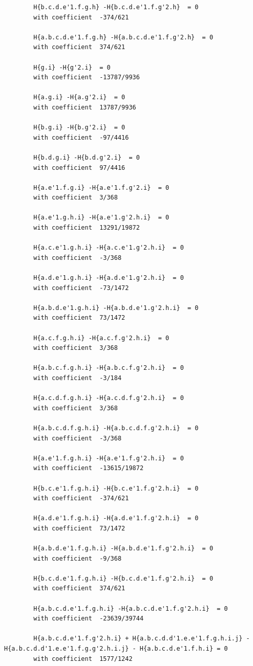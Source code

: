 \documentclass[11pt, a4paper]{kybernetika}
\begin{document}
\begin{verbatim}
		H{b.c.d.e'1.f.g.h} -H{b.c.d.e'1.f.g'2.h}  = 0
		with coefficient  -374/621
		
		H{a.b.c.d.e'1.f.g.h} -H{a.b.c.d.e'1.f.g'2.h}  = 0
		with coefficient  374/621
		
		H{g.i} -H{g'2.i}  = 0
		with coefficient  -13787/9936
		
		H{a.g.i} -H{a.g'2.i}  = 0
		with coefficient  13787/9936
		
		H{b.g.i} -H{b.g'2.i}  = 0
		with coefficient  -97/4416
		
		H{b.d.g.i} -H{b.d.g'2.i}  = 0
		with coefficient  97/4416
		
		H{a.e'1.f.g.i} -H{a.e'1.f.g'2.i}  = 0
		with coefficient  3/368
		
		H{a.e'1.g.h.i} -H{a.e'1.g'2.h.i}  = 0
		with coefficient  13291/19872
		
		H{a.c.e'1.g.h.i} -H{a.c.e'1.g'2.h.i}  = 0
		with coefficient  -3/368
		
		H{a.d.e'1.g.h.i} -H{a.d.e'1.g'2.h.i}  = 0
		with coefficient  -73/1472
		
		H{a.b.d.e'1.g.h.i} -H{a.b.d.e'1.g'2.h.i}  = 0
		with coefficient  73/1472
		
		H{a.c.f.g.h.i} -H{a.c.f.g'2.h.i}  = 0
		with coefficient  3/368
		
		H{a.b.c.f.g.h.i} -H{a.b.c.f.g'2.h.i}  = 0
		with coefficient  -3/184
		
		H{a.c.d.f.g.h.i} -H{a.c.d.f.g'2.h.i}  = 0
		with coefficient  3/368
		
		H{a.b.c.d.f.g.h.i} -H{a.b.c.d.f.g'2.h.i}  = 0
		with coefficient  -3/368
		
		H{a.e'1.f.g.h.i} -H{a.e'1.f.g'2.h.i}  = 0
		with coefficient  -13615/19872
		
		H{b.c.e'1.f.g.h.i} -H{b.c.e'1.f.g'2.h.i}  = 0
		with coefficient  -374/621
		
		H{a.d.e'1.f.g.h.i} -H{a.d.e'1.f.g'2.h.i}  = 0
		with coefficient  73/1472
		
		H{a.b.d.e'1.f.g.h.i} -H{a.b.d.e'1.f.g'2.h.i}  = 0
		with coefficient  -9/368
		
		H{b.c.d.e'1.f.g.h.i} -H{b.c.d.e'1.f.g'2.h.i}  = 0
		with coefficient  374/621
		
		H{a.b.c.d.e'1.f.g.h.i} -H{a.b.c.d.e'1.f.g'2.h.i}  = 0
		with coefficient  -23639/39744
		
		H{a.b.c.d.e'1.f.g'2.h.i} + H{a.b.c.d.d'1.e.e'1.f.g.h.i.j} - H{a.b.c.d.d'1.e.e'1.f.g.g'2.h.i.j} - H{a.b.c.d.e'1.f.h.i} = 0
		with coefficient  1577/1242
		

\end{verbatim}
\end{document}
